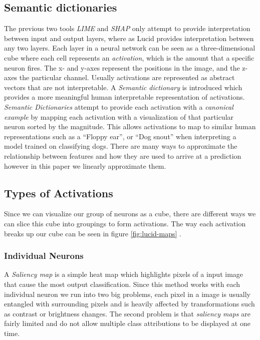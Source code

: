 \subsection{Semantic dictionaries}
The previous two tools \emph{LIME} and \emph{SHAP} only attempt to provide interpretation  between input and output layers, where as Lucid provides interpretation between any two layers. Each layer in a neural network can be seen as a three-dimensional cube where each cell represents an \emph{activation}, which is the amount that a specific neuron fires. The x- and y-axes represent the positions in the image, and the z-axes the particular channel. Usually activations are represented as abstract vectors that are not interpretable. A \emph{Semantic dictionary} is introduced which provides a more meaningful human interpretable representation of activations. \emph{Semantic Dictionaries} attempt to provide each activation with a \emph{canonical example} by mapping each activation with a visualization of that particular neuron sorted by the magnitude. This allows activations to map to similar human representations such as a ``Floppy ear'', or ``Dog snout'' when interpreting a model trained on classifying dogs. There are many ways to approximate the relationship between features and how they are used to arrive at a prediction however in this paper we linearly approximate them. 

\subsection{Types of Activations}
Since we can visualize our group of neurons as a cube, there are different ways we can slice this cube into groupings to form activations. The way each activation breaks up our cube can be seen in figure \ref{fig:lucid-maps}
.
\subsubsection{Individual Neurons}
A \emph{Saliency map} is a simple heat map which highlights pixels of a input image that cause the most output classification. Since this method works with each individual neuron we run into two big problems, each pixel in a image is usually entangled with surrounding pixels and is heavily affected by transformations such as contrast or brightness changes. The second problem is that \emph{saliency maps} are fairly limited and do not allow multiple class attributions to be displayed at one time.

